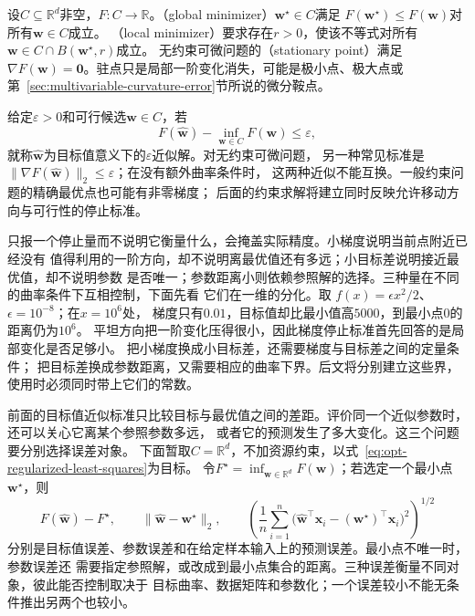 \begin{definition}
\label{def:opt-solutions-stationarity}
设$C\subseteq\mathbb R^d$非空，$F:C\to\mathbb R$。（global minimizer）$\bm{w}^{\star}\in C$满足
$F(\bm{w}^{\star})\leq F(\bm{w})$对所有$\bm{w}\in C$成立。
（local minimizer）要求存在$r>0$，使该不等式对所有
$\bm w\in C\cap B(\bm w^\star,r)$成立。
无约束可微问题的（stationary point）满足
$\nabla F(\bm{w})=\bm{0}$。驻点只是局部一阶变化消失，可能是极小点、极大点或
第~\ref{sec:multivariable-curvature-error}节所说的微分鞍点。
\end{definition}
给定$\varepsilon>0$和可行候选$\widehat{\bm w}\in C$，若
\[
  F(\widehat{\bm{w}})-\inf_{\bm{w}\in C}F(\bm{w})\leq\varepsilon,
\]
就称$\widehat{\bm{w}}$为目标值意义下的$\varepsilon$近似解。对无约束可微问题，
另一种常见标准是
$\lVert\nabla F(\widehat{\bm{w}})\rVert_2\leq\varepsilon$；在没有额外曲率条件时，
这两种近似不能互换。一般约束问题的精确最优点也可能有非零梯度；
后面的约束求解将建立同时反映允许移动方向与可行性的停止标准。

只报一个停止量而不说明它衡量什么，会掩盖实际精度。小梯度说明当前点附近已经没有
值得利用的一阶方向，却不说明离最优值还有多远；小目标差说明接近最优值，却不说明参数
是否唯一；参数距离小则依赖参照解的选择。三种量在不同的曲率条件下互相控制，下面先看
它们在一维的分化。取
$f(x)=\epsilon x^2/2$、$\epsilon=10^{-8}$；在$x=10^6$处，
梯度只有$0.01$，目标值却比最小值高$5000$，到最小点$0$的距离仍为$10^6$。
平坦方向把一阶变化压得很小，因此梯度停止标准首先回答的是局部变化是否足够小。
把小梯度换成小目标差，还需要梯度与目标差之间的定量条件；
把目标差换成参数距离，又需要相应的曲率下界。后文将分别建立这些界，
使用时必须同时带上它们的常数。

前面的目标值近似标准只比较目标与最优值之间的差距。评价同一个近似参数时，还可以关心它离某个参照参数多远，
或者它的预测发生了多大变化。这三个问题要分别选择误差对象。
下面暂取$C=\mathbb{R}^d$，不加资源约束，以式~\eqref{eq:opt-regularized-least-squares}为目标。
令$F^\star=\inf_{\bm{w}\in\mathbb{R}^d}F(\bm{w})$；若选定一个最小点
$\bm{w}^\star$，则
\[
  F(\widehat{\bm{w}})-F^\star,\qquad
  \lVert\widehat{\bm{w}}-\bm{w}^\star\rVert_2,\qquad
  \left(
    \frac{1}{n}\sum_{i=1}^{n}
    \bigl(
      \widehat{\bm{w}}^{\top}\bm{x}_i
      -(\bm{w}^\star)^{\top}\bm{x}_i
    \bigr)^2
  \right)^{1/2}
\]
分别是目标值误差、参数误差和在给定样本输入上的预测误差。最小点不唯一时，参数误差还
需要指定参照解，或改成到最小点集合的距离。三种误差衡量不同对象，彼此能否控制取决于
目标曲率、数据矩阵和参数化；一个误差较小不能无条件推出另两个也较小。

